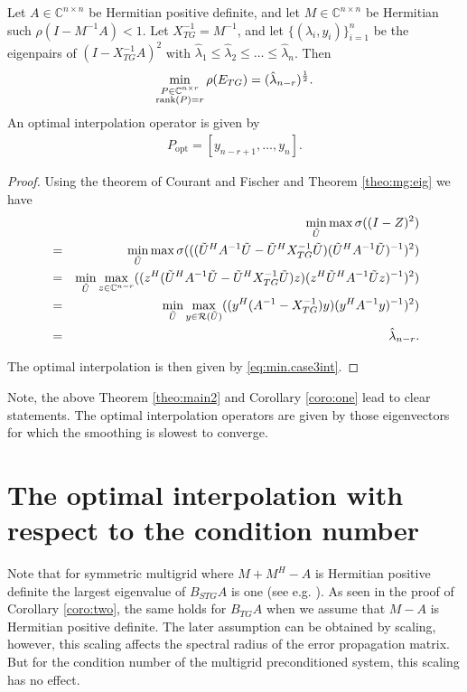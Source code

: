 \documentclass[final]{siamltex}
\newcommand{\beqo}{\begin{eqnarray*}}
\newcommand{\beq}{\begin{eqnarray}}
\newcommand{\eeqo}{\end{eqnarray*}}
\newcommand{\eeq}{\end{eqnarray}}
\numberwithin{equation}{section}
\newcommand{\ran} {{\cal R}}
\newcommand{\bC}{\mathbb{C}}
\newcommand{\Cnr}{\mathbb{C}^{n \times r}}
\newcommand{\inCnn}{\in \mathbb{C}^{n \times n}}
\begin{document}
\begin{theorem} \label{theo:main2}
Let  $A\inCnn$  be Hermitian positive definite, and let $ M \inCnn$ be
Hermitian
such $\rho(I - M^{-1}A) < 1$.
Let $X_{TG}^{-1} =  M^{-1}$,
and let $\{(\lambda_i,y_i)\}_{i=1}^n$ be the eigenpairs of $(I -
X_{TG}^{-1}A)^2$ with $
\hat \lambda_1 \leq \hat \lambda_2 \leq \ldots \leq  \hat \lambda_n $. Then
\beq \label{eq:min.case3}
\min_{\substack{P \in \Cnr \\ \rank(P)=r}}\rho(E_{TG}) = (\hat
\lambda_{n-r})^{\frac{1}{2}}.
\eeq
An optimal interpolation operator is given by 
\beq  \label{eq:min.case3int}
P_{\mathrm{opt}} = [y_{n-r+1}, \ldots , y_n].
\eeq
\end{theorem}
\begin{proof}
Using the theorem of Courant and Fischer and Theorem \ref{theo:mg:eig} we have
\beqo
& & \min_{\tilde U} \max \sigma((I - Z)^2) \\
& = & \min_{\tilde U} \max \sigma( ((\tilde U^HA^{-1}\tilde U - \tilde
U^HX_{TG}^{-1}\tilde U) (\tilde U^HA^{-1}\tilde U)^{-1})^2)\\
& = & \min_{\tilde U} \max_{z \in \bC ^{n-r}}  ((z^H(\tilde U^HA^{-1}\tilde U -
\tilde U^HX_{TG}^{-1}\tilde U)z) (z^H\tilde U^HA^{-1}\tilde Uz)^{-1})^2)\\
& = & \min_{\tilde U} \max_{y \in \ran (\tilde U)}  ((y^H(A^{-1} -
X_{TG}^{-1})y) (y^HA^{-1}y)^{-1})^2)\\
& = & \hat \lambda_{n-r}.
\eeqo
  
The optimal interpolation is then given by \eqref{eq:min.case3int}.
\end{proof}


Note, the above Theorem \ref{theo:main2} and  Corollary \ref{coro:one} lead to
clear statements. The optimal interpolation operators are given by those
eigenvectors for which the smoothing is slowest to converge.







\section{The optimal interpolation with respect to the  condition number}





Note  that for symmetric multigrid where  $M + M^H - A$ is Hermitian  positive
definite  the largest eigenvalue of
$B_{STG}A$ is one (see e.g. \cite{Not15}).  As seen in the proof of Corollary
\ref{coro:two}, the same holds  for  $B_{TG}A$ when we assume  that  $M - A$ is
Hermitian  positive definite. The later
assumption can be obtained  by scaling, however, this scaling affects the
spectral radius of the
error propagation matrix. But for the condition number of the multigrid
preconditioned system, this scaling has no effect.
\end{document}

